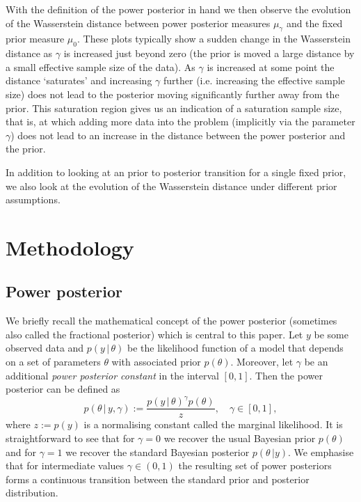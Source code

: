 \documentclass[12pt]{article}
\newcommand{\jsh}[1]{\todo[inline,color=green!20, caption={2do}]{\textbf{Jack:}\\#1}}
\begin{document}
With the definition of the power posterior in hand we then observe the
evolution of the Wasserstein distance between power posterior measures
$\mu_{\gamma}$ and the fixed prior measure $\mu_{0}$. These plots typically
show a sudden change in the Wasserstein distance as $\gamma$ is increased just
beyond zero (the prior is moved a large distance by a small effective sample
size of the data). As $\gamma$ is increased at some point the distance
`saturates' and increasing $\gamma$ further (i.e. increasing the effective
sample size) does not lead to the posterior moving significantly further away
from the prior. This saturation region gives us an indication of a saturation
sample size, that is, at which adding more data into the problem (implicitly
via the parameter $\gamma$) does not lead to an increase in the distance
between the power posterior and the prior.

\jsh{Finish this final paragraph}

In addition to looking at an prior to posterior transition for a single fixed
prior, we also look at the evolution of the Wasserstein distance under
different prior assumptions.

\section{Methodology}

\subsection{Power posterior}
We briefly recall the mathematical concept of the power posterior (sometimes
also called the fractional posterior) which is central to this paper. Let $y$
be some observed data and $p(y\, | \, \theta)$ be the likelihood function of a
model that depends on a set of parameters $\theta$ with associated prior
$p(\theta)$. Moreover, let $\gamma$ be an additional \emph{power posterior
constant} in the interval $[0, 1]$. Then the power posterior
\citep{friel2008marginal} can be defined as
\begin{equation}
\label{eq:pow_pos}
p(\theta \, | \, y,\gamma) := \frac{p(y \, | \, \theta)^\gamma p(\theta)}{z}, \quad \gamma \in [0, 1],
\end{equation}
where $z := p(y)$ is a normalising constant called the marginal likelihood. It
is straightforward to see that for $\gamma = 0$ we recover the usual Bayesian
prior $p(\theta)$ and for $\gamma = 1$ we recover the standard Bayesian
posterior $p(\theta \, | y)$. We emphasise that for intermediate values $\gamma
\in (0, 1)$ the resulting set of power posteriors forms a continuous
transition between the standard prior and posterior distribution.
\end{document}
